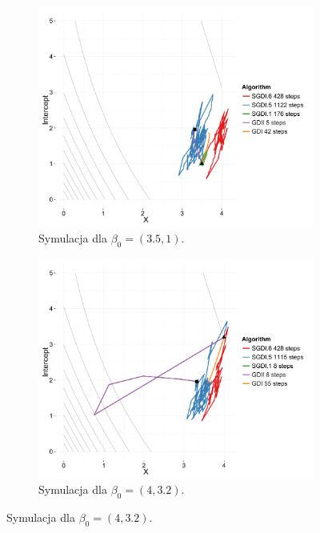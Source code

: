 \begin{figure}[h!]
\begin{center}
\begin{subfigure}[h!]{0.45\textwidth}
      \end{subfigure}
   \begin{subfigure}[h!]{0.45\textwidth}
           \includegraphics[width=\textwidth]{Obrazki/contour_35_1.pdf}
           \caption{Symulacja dla $\beta_0 = (3.5,1)$.}
                 \end{subfigure}
   \begin{subfigure}[h!]{0.45\textwidth}
              \includegraphics[width=\textwidth]{Obrazki/contour_4_32.pdf}
              \caption{Symulacja dla $\beta_0 = (4,3.2)$.}
            \end{subfigure}

\end{center}
\end{figure}
